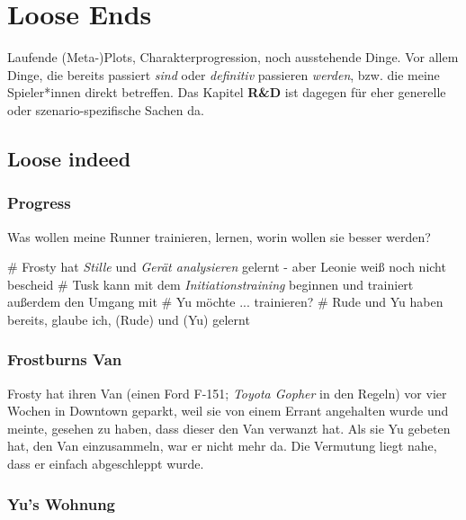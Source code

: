 \chapter{Loose Ends}

Laufende (Meta-)Plots, Charakterprogression, noch ausstehende Dinge. Vor allem Dinge, die bereits passiert \textit{sind} oder \textit{definitiv} passieren \textit{werden}, bzw. die meine Spieler*innen direkt betreffen. Das Kapitel \textbf{R\&D} ist dagegen für eher generelle oder szenario-spezifische Sachen da.




\section{Loose indeed}


\subsection{Progress}

Was wollen meine Runner trainieren, lernen, worin wollen sie besser werden?

\begin{easylist}
    # Frosty hat \textit{Stille} und \textit{Gerät analysieren} gelernt - aber Leonie weiß noch nicht bescheid
    # Tusk kann mit dem \textit{Initiationstraining} beginnen und trainiert außerdem den Umgang mit 
    # Yu möchte ... trainieren? 
    # Rude und Yu haben bereits, glaube ich,  (Rude) und  (Yu) gelernt
\end{easylist}




\subsection{Frostburns Van}

Frosty hat ihren Van (einen Ford F-151; \textit{Toyota Gopher} in den Regeln) vor vier Wochen in Downtown geparkt, weil sie von einem Errant angehalten wurde und meinte, gesehen zu haben, dass dieser den Van verwanzt hat. Als sie Yu gebeten hat, den Van einzusammeln, war er nicht mehr da. Die Vermutung liegt nahe, dass er einfach abgeschleppt wurde.




\subsection{Yu's Wohnung}

